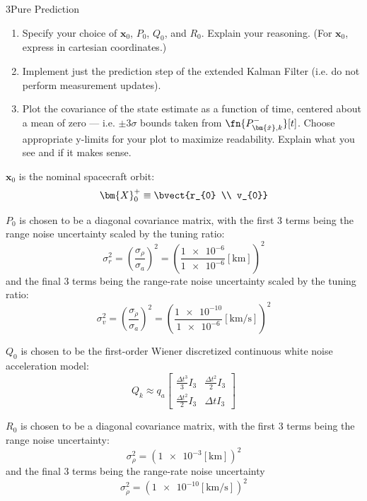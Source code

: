 \begin{hwkProblem}{3}{Pure Prediction} \label{hwk:p03}

	\begin{enumerate}[label=\alph*.]
		\item \label{hwk:p03a} Specify your choice of \( \bm{x}_{0} \), \( P_{0} \), \( Q_{0} \), and \( R_{0} \). Explain your reasoning. (For \( \bm{x}_{0} \), express in cartesian coordinates.)
		\item \label{hwk:p03b} Implement just the prediction step of the extended Kalman Filter (i.e. do not perform measurement updates).
		\item \label{hwk:p03c} Plot the covariance of the state estimate as a function of time, centered about a mean of zero --- i.e. \( \pm 3 \sigma \) bounds taken from \( \fn{P_{\bm{\hat{x}}, k}^{-}}[t] \). Choose appropriate y-limits for your plot to maximize readability. Explain what you see and if it makes sense.
	\end{enumerate}

	\hwkSol{} \label{hwk:s03}

	\hwkPart{} \label{hwk:s03a}

	\( \bm{x}_{0} \) is the nominal spacecraft orbit:
	\[
		\bm{X}_0^{+} \equiv \bvect{r_{0} \\ v_{0}}
	\]

	\( P_{0} \) is chosen to be a diagonal covariance matrix, with the first 3 terms being the range noise uncertainty scaled by the tuning ratio:
	\[
		\sigma_{r}^{2} = \left(\frac{\sigma_{\rho}}{\sigma_{a}}\right)^{2} = \left(\frac{\num{1e-6}}{\num{1e-6}}\left[\unit{\km}\right]\right)^{2}
	\]
	and the final 3 terms being the range-rate noise uncertainty scaled by the tuning ratio:
	\[
		\sigma_{v}^{2} = \left(\frac{\sigma_{\dot{\rho}}}{\sigma_{a}}\right)^{2} = \left(\frac{\num{1e-10}}{\num{1e-6}}\left[\unit{\km\per\s}\right]\right)^{2}
	\]

	\( Q_{0} \) is chosen to be the first-order Wiener discretized continuous white noise acceleration model:
	\[
		Q_k \approx q_a\left[\begin{array}{cc}
				\frac{\Delta t^3}{3} I_3 & \frac{\Delta t^2}{2} I_3 \\
				\frac{\Delta t^2}{2} I_3 & \Delta t I_3
		\end{array}\right]
	\]

	\( R_{0} \) is chosen to be a diagonal covariance matrix, with the first 3 terms being the range noise uncertainty:
	\[
		\sigma_{\rho}^{2} = \left(\num{1e-3}\left[\unit{\km}\right]\right)^{2}
	\]
	and the final 3 terms being the range-rate noise uncertainty
	\[
		\sigma_{\dot{\rho}}^{2} = \left(\num{1e-10}\left[\unit{\km\per\s}\right]\right)^{2}
	\]


\end{hwkProblem}
